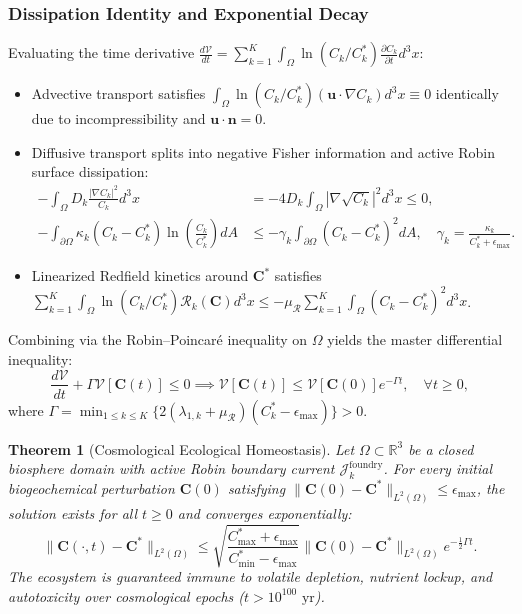 \documentclass[11pt,onecolumn]{article}
\newtheorem{theorem}{Theorem}
\begin{document}
\subsubsection{Dissipation Identity and Exponential Decay}
Evaluating the time derivative $\frac{d\mathcal{V}}{dt} = \sum_{k=1}^K \int_\Omega \ln(C_k/C_k^*) \frac{\partial C_k}{\partial t} d^3x$:
\begin{itemize}
    \item Advective transport satisfies $\int_\Omega \ln(C_k/C_k^*) (\mathbf{u} \cdot \nabla C_k) d^3x \equiv 0$ identically due to incompressibility and $\mathbf{u} \cdot \mathbf{n} = 0$.
    \item Diffusive transport splits into negative Fisher information and active Robin surface dissipation:
    \begin{align}
    -\int_\Omega D_k \frac{|\nabla C_k|^2}{C_k} d^3x &= -4 D_k \int_\Omega |\nabla\sqrt{C_k}|^2 d^3x \le 0, \\
    -\int_{\partial\Omega} \kappa_k (C_k - C_k^*) \ln\left(\frac{C_k}{C_k^*}\right) dA &\le -\gamma_k \int_{\partial\Omega} (C_k - C_k^*)^2 dA, \quad \gamma_k = \frac{\kappa_k}{C_k^* + \epsilon_{\max}}.
    \end{align}
    \item Linearized Redfield kinetics around $\mathbf{C}^*$ satisfies $\sum_{k=1}^K \int_\Omega \ln(C_k/C_k^*) \mathcal{R}_k(\mathbf{C}) d^3x \le -\mu_{\mathcal{R}} \sum_{k=1}^K \int_\Omega (C_k - C_k^*)^2 d^3x$.
\end{itemize}
Combining via the Robin--Poincar\'e inequality on $\Omega$ yields the master differential inequality:
\begin{equation}
\label{eq:lyapunov_exponential_decay_pde}
\frac{d\mathcal{V}}{dt} + \Gamma \mathcal{V}[\mathbf{C}(t)] \le 0 \implies \mathcal{V}[\mathbf{C}(t)] \le \mathcal{V}[\mathbf{C}(0)] e^{-\Gamma t}, \quad \forall t \ge 0,
\end{equation}
where $\Gamma = \min_{1 \le k \le K} \{ 2(\lambda_{1, k} + \mu_{\mathcal{R}})(C_k^* - \epsilon_{\max}) \} > 0$.

\begin{theorem}[Cosmological Ecological Homeostasis]
\label{thm:cosmological_stability}
Let $\Omega \subset \mathbb{R}^3$ be a closed biosphere domain with active Robin boundary current $\mathcal{J}_k^{\mathrm{foundry}}$. For every initial biogeochemical perturbation $\mathbf{C}(0)$ satisfying $\|\mathbf{C}(0) - \mathbf{C}^*\|_{L^2(\Omega)} \le \epsilon_{\max}$, the solution exists for all $t \ge 0$ and converges exponentially:
\begin{equation}
\label{eq:l2_norm_exponential_bound}
\|\mathbf{C}(\cdot, t) - \mathbf{C}^*\|_{L^2(\Omega)} \le \sqrt{\frac{C_{\max}^* + \epsilon_{\max}}{C_{\min}^* - \epsilon_{\max}}} \|\mathbf{C}(0) - \mathbf{C}^*\|_{L^2(\Omega)} e^{-\frac{1}{2}\Gamma t}.
\end{equation}
The ecosystem is guaranteed immune to volatile depletion, nutrient lockup, and autotoxicity over cosmological epochs ($t > 10^{100}\text{ yr}$).
\end{theorem}
\end{document}
